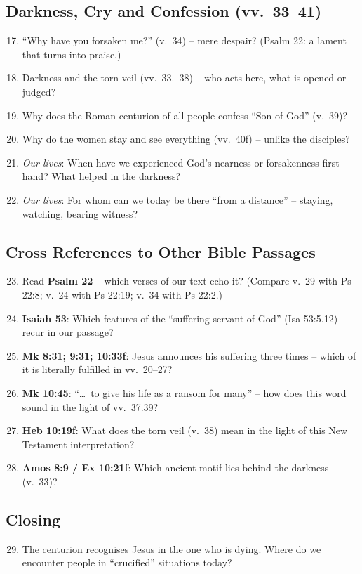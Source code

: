 \documentclass[12pt,a4paper]{article}
\begin{document}
\subsection*{Darkness, Cry and Confession (vv.~33--41)}
\begin{enumerate}\setcounter{enumi}{16}
  \item ``Why have you forsaken me?'' (v.~34) -- mere despair? (Psalm 22: a lament that turns into praise.)
  \item Darkness and the torn veil (vv.~33.~38) -- who acts here, what is opened or judged?
  \item Why does the Roman centurion of all people confess ``Son of God'' (v.~39)?
  \item Why do the women stay and see everything (vv.~40f) -- unlike the disciples?
  \item \emph{Our lives}: When have we experienced God's nearness or forsakenness first-hand? What helped in the darkness?
  \item \emph{Our lives}: For whom can we today be there ``from a distance'' -- staying, watching, bearing witness?
\end{enumerate}

\subsection*{Cross References to Other Bible Passages}
\begin{enumerate}\setcounter{enumi}{22}
  \item Read \textbf{Psalm 22} -- which verses of our text echo it? (Compare v.~29 with Ps 22:8; v.~24 with Ps 22:19; v.~34 with Ps 22:2.)
  \item \textbf{Isaiah 53}: Which features of the ``suffering servant of God'' (Isa 53:5.12) recur in our passage?
  \item \textbf{Mk 8:31; 9:31; 10:33f}: Jesus announces his suffering three times -- which of it is literally fulfilled in vv.~20--27?
  \item \textbf{Mk 10:45}: ``\ldots\ to give his life as a ransom for many'' -- how does this word sound in the light of vv.~37.39?
  \item \textbf{Heb 10:19f}: What does the torn veil (v.~38) mean in the light of this New Testament interpretation?
  \item \textbf{Amos 8:9 / Ex 10:21f}: Which ancient motif lies behind the darkness (v.~33)?
\end{enumerate}

\subsection*{Closing}
\begin{enumerate}\setcounter{enumi}{28}
  \item The centurion recognises Jesus in the one who is dying. Where do we encounter people in ``crucified'' situations today?
\end{enumerate}
\end{document}
